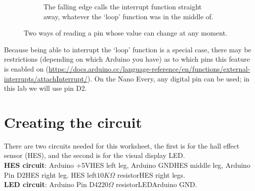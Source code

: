 \documentclass[11pt,a4paper]{article}
\begin{document}
\begin{figure}[ht!]
\begin{center}
\begin{subfigure}[t]{.46\textwidth}
            \caption{The falling edge calls the interrupt function straight away, whatever the `loop' function was in the middle of.}
            \label{fig:interrupt}
        \end{subfigure}
    \end{center}
    \caption{Two ways of reading a pin whose value can change at any moment.}
    \label{fig:reading-a-pin}
\end{figure}

Because being able to interrupt the `loop' function is a special case, there may be restrictions (depending on which Arduino you have) as to which pins this feature is enabled on (\url{https://docs.arduino.cc/language-reference/en/functions/external-interrupts/attachInterrupt/}). On the Nano Every, any digital pin can be used; in this lab we will use pin D2.

\section{Creating the circuit}
\label{sec:circuit}
There are two circuits needed for this worksheet, the first is for the hall effect sensor (HES), and the second is for the visual display LED.\\
\textbf{HES circuit}: Arduino +5V\textrightarrow\hspace{0.1em}HES left leg, Arduino GND\textrightarrow\hspace{0.1em}HES middle leg, Arduino Pin D2\textrightarrow\hspace{0.1em}HES right leg. HES left\textrightarrow \hspace{0.1em}$10K\Omega$ resistor\textrightarrow\hspace{0.1em}HES right legs.\\
\textbf{LED circuit}: Arduino Pin D4\textrightarrow $220\Omega$ resistor\textrightarrow LED\textrightarrow Arduino GND.
\end{document}
